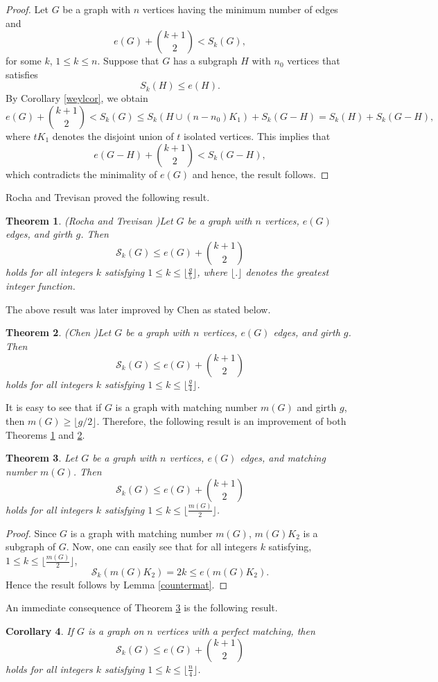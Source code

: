 \documentclass[12pt]{article}
\theoremstyle{plain}
\newtheorem{theorem}{Theorem}[section]
\newtheorem{corollary}[theorem]{Corollary}
\theoremstyle{definition}
\begin{document}
\begin{proof}
Let $G$ be a graph with $n$ vertices having the minimum number of edges and $$
e(G)+\binom{k+1}{2}<S_k(G),$$ for some $k$, $1\leq k\leq n$. 
Suppose that $G$ has a subgraph $H$ with $n_0$ vertices that satisfies $$S_k\left(H\right) \leq e\left(H\right).$$
By  Corollary \ref{weylcor}, we obtain  $$e(G)+\binom{k+1}{2}<S_k(G) \leq S_k\left(H\cup (n-n_0)K_1\right)+S_k\left(G-H \right)=S_k\left(H\right)+S_k\left(G-H \right),$$
where $tK_1$ denotes the disjoint union of 
$t$ isolated vertices. This implies that $$e(G-H)+\binom{k+1}{2}<S_k(G-H),$$ which contradicts the minimality of $e(G)$ and hence, the result follows. 	
\end{proof} 
Rocha and Trevisan \cite{Rocha2014} proved the following result.
\begin{theorem}{\rm (Rocha and Trevisan \cite{Rocha2014})}\label{rochatra}
Let $G$ be a graph with $n$ vertices, $e(G)$ edges, and girth $g$. Then 
$$\mathcal{S}_k(G)\leq e(G)+\binom{k+1}{2}$$ holds for all integers $k$ satisfying $1\leq k\leq \lfloor\frac{g}{5}\rfloor$, where $\lfloor . \rfloor$ denotes the greatest integer function.
\end{theorem}
The above result was later improved by Chen \cite{Chen2018a} as stated below.

\begin{theorem} {\rm (Chen \cite{Chen2018a})}\label{cheng}
Let $G$ be a graph with $n$ vertices, $e(G)$ edges, and girth $g$. Then 
$$\mathcal{S}_k(G)\leq e(G)+\binom{k+1}{2}$$ holds for all integers $k$ satisfying $1\leq k\leq \lfloor \frac{g}{4}\rfloor$.
\end{theorem}
 
It is easy to see that if $G$ is a graph with matching number $m(G)$ and girth $g$, then $m(G) \geq \lfloor g / 2 \rfloor$. Therefore, the following result is an  improvement of both Theorems \ref{rochatra} and \ref{cheng}.

\begin{theorem}\label{bromatc}
Let $G$ be a graph with $n$ vertices, $e(G)$ edges, and matching number $m(G)$. Then $$\mathcal{S}_k(G) \leq e(G)+\binom{k+1}{2}$$ holds for all integers $k$ satisfying  $1 \leq k \leq\lfloor \frac{m(G)} { 2}\rfloor$.
\end{theorem} 
\begin{proof}
Since $G$ is a graph with matching number $m(G)$, $m(G)K_2$ is a subgraph of $G$. Now, one can easily see that for all integers 	$k$ satisfying, $1 \leq k \leq\lfloor \frac{m(G)} {2} \rfloor$,  
$$\mathcal{S}_k(m(G)K_2)=2k\leq e(m(G)K_2).$$ Hence the result follows by Lemma \ref{countermat}.
\end{proof}
An immediate consequence of Theorem \ref{bromatc} is the following result.
\begin{corollary}
If $G$ is a graph on $n$ vertices with a perfect matching, then $$\mathcal{S}_k(G) \leq e(G)+\binom{k+1}{2}$$ holds for all integers $k$ satisfying $1\leq k \leq\lfloor\frac{n}{4}\rfloor$.
\end{corollary} 
 
\end{document}
